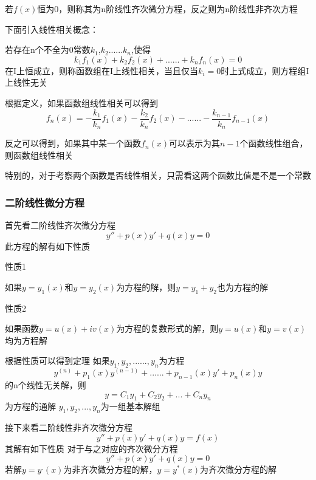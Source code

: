 \documentclass{article}
\begin{document}
若$f(x)$恒为0，则称其为n阶线性齐次微分方程，反之则为n阶线性非齐次方程

下面引入线性相关概念：

若存在n个不全为0常数$k_1$,$k_2$......$k_n$,使得
\[k_1f_1(x)+k_2f_2(x)+......+k_nf_n(x)=0\]
在I上恒成立，则称函数组在I上线性相关，当且仅当$k_i=0$时上式成立，则方程组I上线性无关

根据定义，如果函数组线性相关可以得到
\[f_n(x)=-\frac{k_1}{k_n}f_1(x)-\frac{k_2}{k_n}f_2(x)-......-\frac{k_{n-1}}{k_n}f_{n-1}(x)\]

反之可以得到，如果其中某一个函数$f_n(x)$可以表示为其$n-1$个函数线性组合，则函数组线性相关

特别的，对于考察两个函数是否线性相关，只需看这两个函数比值是不是一个常数

\subsubsection{二阶线性微分方程}
首先看二阶线性齐次微分方程
\[y''+p(x)y'+q(x)y=0\]
此方程的解有如下性质

性质1

如果$y=y_1(x)$和$y=y_2(x)$为方程的解，则$y=y_1+y_2$也为方程的解

性质2

如果函数$y=u(x)+iv(x)$为方程的复数形式的解，则$y=u(x)$和$y=v(x)$均为方程解

根据性质可以得到定理
如果$y_1,y_2,......,y_n$为方程
\[y^{(n)}+p_1(x)y^{(n-1)}+......+p_{n-1}(x)y'+p_n(x)y\]
的n个线性无关解，则
\[y=C_1y_1+C_2y_2+...+C_ny_n\]
为方程的通解
$y_1,y_2,...,y_n$为一组基本解组

接下来看二阶线性非齐次微分方程
\[y''+p(x)y'+q(x)y=f\left(x\right)\]
其解有如下性质
对于与之对应的齐次微分方程
\[y''+p(x)y'+q(x)y=0\]
若解$y=y^.(x)$为非齐次微分方程的解，$y=y^*(x)$为齐次微分方程的解
\end{document}
